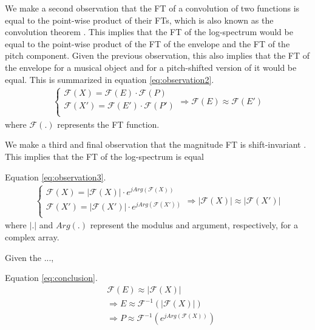\documentclass[journal]{IEEEtran}
\begin{document}
We make a second observation that the FT of a convolution of two functions is equal to the point-wise product of their FTs, which is also known as the convolution theorem \cite{proakis1995}. This implies that the FT of the log-spectrum would be equal to the point-wise product of the FT of the envelope and the FT of the pitch component. Given the previous observation, this also implies that the FT of the envelope for a musical object and for a pitch-shifted version of it would be equal. This is summarized in equation \ref{eq:observation2}.
\begin{equation}
\label{eq:observation2}
\begin{split}
\begin{cases}
\mathcal{F}(X) = \mathcal{F}(E) \cdot \mathcal{F}(P) \\
\mathcal{F}(X') = \mathcal{F}(E') \cdot \mathcal{F}(P') \\
\end{cases}
\Rightarrow \mathcal{F}(E) \approx \mathcal{F}(E')
\end{split}
\end{equation}
where $\mathcal{F}(.)$ represents the FT function.

We make a third and final observation that the magnitude FT is shift-invariant \cite{proakis1995}. This implies that the FT of the log-spectrum is equal 

Equation \ref{eq:observation3}.
\begin{equation}
\label{eq:observation3}
\begin{split}
\begin{cases}
\mathcal{F}(X) = |\mathcal{F}(X)| \cdot e^{j Arg(\mathcal{F}(X))} \\
\mathcal{F}(X') = |\mathcal{F}(X')| \cdot e^{j Arg(\mathcal{F}(X'))} \\
\end{cases}
\Rightarrow |\mathcal{F}(X)| \approx |\mathcal{F}(X')|
\end{split}
\end{equation}
where $|.|$ and $Arg(.)$ represent the modulus and argument, respectively, for a complex array. 

Given the ..., 

Equation \ref{eq:conclusion}.
\begin{equation}
\label{eq:conclusion}
\begin{split}
&\mathcal{F}(E) \approx |\mathcal{F}(X)| \\
&\Rightarrow E \approx \mathcal{F}^{-1}(|\mathcal{F}(X)|) \\
&\Rightarrow P \approx \mathcal{F}^{-1}(e^{j Arg(\mathcal{F}(X))})
\end{split}
\end{equation}
\end{document}
